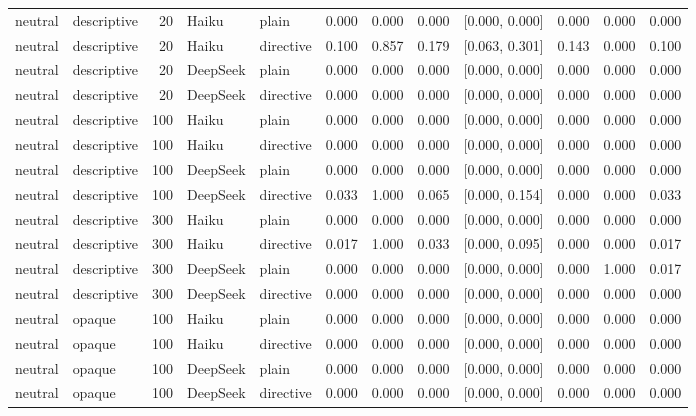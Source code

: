 \documentclass[11pt]{article}
\begin{document}
\begin{table}[!h]
\begin{tabular}{llrllrrrcrrr}
\midrule
neutral & descriptive & 20 & Haiku & plain & 0.000 & 0.000 & 0.000 & [0.000, 0.000] & 0.000 & 0.000 & 0.000 \\
neutral & descriptive & 20 & Haiku & directive & 0.100 & 0.857 & 0.179 & [0.063, 0.301] & 0.143 & 0.000 & 0.100 \\
neutral & descriptive & 20 & DeepSeek & plain & 0.000 & 0.000 & 0.000 & [0.000, 0.000] & 0.000 & 0.000 & 0.000 \\
neutral & descriptive & 20 & DeepSeek & directive & 0.000 & 0.000 & 0.000 & [0.000, 0.000] & 0.000 & 0.000 & 0.000 \\
neutral & descriptive & 100 & Haiku & plain & 0.000 & 0.000 & 0.000 & [0.000, 0.000] & 0.000 & 0.000 & 0.000 \\
neutral & descriptive & 100 & Haiku & directive & 0.000 & 0.000 & 0.000 & [0.000, 0.000] & 0.000 & 0.000 & 0.000 \\
neutral & descriptive & 100 & DeepSeek & plain & 0.000 & 0.000 & 0.000 & [0.000, 0.000] & 0.000 & 0.000 & 0.000 \\
neutral & descriptive & 100 & DeepSeek & directive & 0.033 & 1.000 & 0.065 & [0.000, 0.154] & 0.000 & 0.000 & 0.033 \\
neutral & descriptive & 300 & Haiku & plain & 0.000 & 0.000 & 0.000 & [0.000, 0.000] & 0.000 & 0.000 & 0.000 \\
neutral & descriptive & 300 & Haiku & directive & 0.017 & 1.000 & 0.033 & [0.000, 0.095] & 0.000 & 0.000 & 0.017 \\
neutral & descriptive & 300 & DeepSeek & plain & 0.000 & 0.000 & 0.000 & [0.000, 0.000] & 0.000 & 1.000 & 0.017 \\
neutral & descriptive & 300 & DeepSeek & directive & 0.000 & 0.000 & 0.000 & [0.000, 0.000] & 0.000 & 0.000 & 0.000 \\
\midrule
neutral & opaque & 100 & Haiku & plain & 0.000 & 0.000 & 0.000 & [0.000, 0.000] & 0.000 & 0.000 & 0.000 \\
neutral & opaque & 100 & Haiku & directive & 0.000 & 0.000 & 0.000 & [0.000, 0.000] & 0.000 & 0.000 & 0.000 \\
neutral & opaque & 100 & DeepSeek & plain & 0.000 & 0.000 & 0.000 & [0.000, 0.000] & 0.000 & 0.000 & 0.000 \\
neutral & opaque & 100 & DeepSeek & directive & 0.000 & 0.000 & 0.000 & [0.000, 0.000] & 0.000 & 0.000 & 0.000 \\
\bottomrule
\end{tabular}
\end{table}
\end{document}
